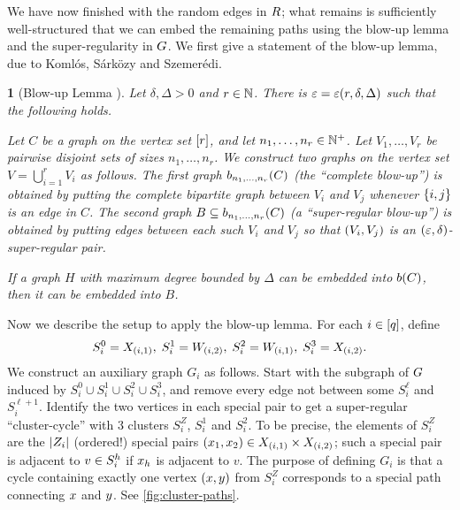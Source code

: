 \documentclass[11pt,english]{article}
\theoremstyle{plain}
\theoremstyle{plain}
\theoremstyle{plain}
\newtheorem{lem}[thm]{\protect\lemmaname}
\theoremstyle{plain}
\theoremstyle{plain}
\theoremstyle{definition}
\theoremstyle{definition}
\theoremstyle{remark}
\theoremstyle{remark}
\theoremstyle{plain}
\theoremstyle{definition}
\theoremstyle{definition}
\theoremstyle{plain}
\theoremstyle{plain}
\theoremstyle{plain}
\newtheorem{mylem}[mythm]{\protect\lemmaname}
\renewenvironment{lem}{\begin{mylem}}{\end{mylem}}
\theoremstyle{plain}
\theoremstyle{remark}
\theoremstyle{plain}
\theoremstyle{definition}
\let\originalleft\left
\let\originalright\right
\renewcommand{\left}{\mathopen{}\mathclose\bgroup\originalleft}
\renewcommand{\right}{\aftergroup\egroup\originalright}
\providecommand{\lemmaname}{Lemma}
\begin{document}
We have now finished with the random edges in $R$; what remains
is sufficiently well-structured that we can embed the remaining paths
using the blow-up lemma and the super-regularity in $G$. We first
give a statement of the blow-up lemma, due to Koml\'os, S\'ark\"ozy
and Szemer\'edi.
\begin{lem}[Blow-up Lemma \cite{KSS97}]
Let $\delta,\Delta>0$ and $r\in\mathbb{N}$. There is $\varepsilon=\varepsilon\left(r,\delta,\Delta\right)$
such that the following holds.

Let $C$ be a graph on the vertex set $\range r$, and let $n_{1},\dots,n_{r}\in\mathbb{N}^{+}$.
Let $V_{1},\dots,V_{r}$ be pairwise disjoint sets of sizes $n_{1},\dots,n_{r}$.
We construct two graphs on the vertex set $V=\bigcup_{i=1}^{r}V_{i}$
as follows. The first graph $b_{n_{1},\dots,n_{r}}\left(C\right)$
(the ``complete blow-up'') is obtained by putting the complete bipartite
graph between $V_{i}$ and $V_{j}$ whenever $\left\{ i,j\right\} $
is an edge in $C$. The second graph $B\subseteq b_{n_{1},\dots,n_{r}}\left(C\right)$
(a ``super-regular blow-up'') is obtained by putting edges between
each such $V_{i}$ and $V_{j}$ so that $\left(V_{i},V_{j}\right)$
is an $\left(\varepsilon,\delta\right)$-super-regular pair.

If a graph $H$ with maximum degree bounded by $\Delta$ can be embedded
into $b\left(C\right)$, then it can be embedded into $B$.
\end{lem}
Now we describe the setup to apply the blow-up lemma. For each $i\in\range q$,
define 
\[
S_{i}^{0}=X_{\left(i,1\right)},\;S_{i}^{1}=W_{\left(i,2\right)},\;S_{i}^{2}=W_{\left(i,1\right)},\;S_{i}^{3}=X_{\left(i,2\right)}.
\]
We construct an auxiliary graph $G_{i}$ as follows. Start with the
subgraph of $G$ induced by $S_{i}^{0}\cup S_{i}^{1}\cup S_{i}^{2}\cup S_{i}^{3}$,
and remove every edge not between some $S_{i}^{\ell}$ and $S_{i}^{\ell+1}$.
Identify the two vertices in each special pair to get a super-regular
``cluster-cycle'' with 3 clusters $S_{i}^{Z}$, $S_{i}^{1}$ and
$S_{i}^{2}$. To be precise, the elements of $S_{i}^{Z}$ are the
$\left|Z_{i}\right|$ (ordered!) special pairs $\left(\x_{1},\x_{2}\right)\in X_{\left(i,1\right)}\times X_{\left(i,2\right)}$;
such a special pair is adjacent to $v\in S_{i}^{h}$ if $x_{h}$
is adjacent to $v$. The purpose of defining $G_{i}$ is that a cycle
containing exactly one vertex $\left(\x,\y\right)$ from $S_{i}^{Z}$
corresponds to a special path connecting $x$ and $y$. See \ref{fig:cluster-paths}.
\end{document}
